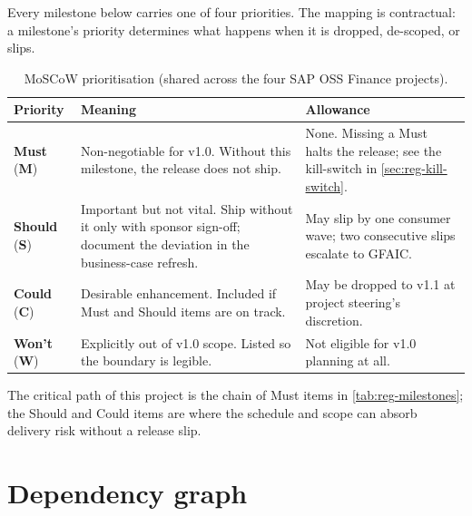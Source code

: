 \documentclass[11pt,a4paper,twoside]{report}
\begin{document}
Every milestone below carries one of four priorities. The mapping is
contractual: a milestone's priority determines what happens when it is
dropped, de-scoped, or slips.

\begin{table}[htbp]
\centering
\caption{MoSCoW prioritisation (shared across the four SAP OSS Finance
projects).}
\label{tab:reg-moscow}
\footnotesize
\begin{tabularx}{\linewidth}{@{}l l X@{}}
\toprule
\textbf{Priority} & \textbf{Meaning} & \textbf{Allowance} \\ \midrule
\textbf{Must} (\textbf{M}) & Non-negotiable for v1.0. Without this milestone, the release does not ship. & None. Missing a Must halts the release; see the kill-switch in \cref{sec:reg-kill-switch}. \\
\textbf{Should} (\textbf{S}) & Important but not vital. Ship without it only with sponsor sign-off; document the deviation in the business-case refresh. & May slip by one consumer wave; two consecutive slips escalate to GFAIC. \\
\textbf{Could} (\textbf{C}) & Desirable enhancement. Included if Must and Should items are on track. & May be dropped to v1.1 at project steering's discretion. \\
\textbf{Won't} (\textbf{W}) & Explicitly out of v1.0 scope. Listed so the boundary is legible. & Not eligible for v1.0 planning at all. \\
\bottomrule
\end{tabularx}
\end{table}

\noindent
The critical path of this project is the chain of Must items in
\cref{tab:reg-milestones}; the Should and Could items are where the
schedule and scope can absorb delivery risk without a release slip.

\section{Dependency graph}\label{sec:reg-dependency-graph}
\end{document}
